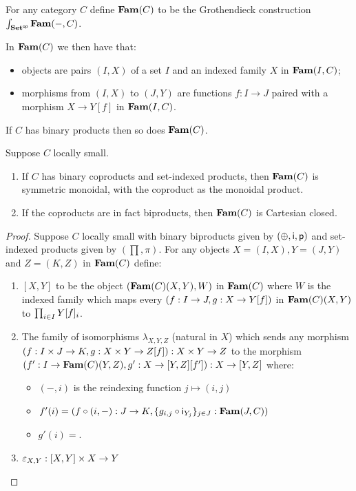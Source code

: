 \begin{definition}
For any category $C$ define $\mathbf{Fam}(C)$ to be the Grothendieck construction
$\int_{\mathbf{Set}^{\mathsf{op}}}\mathbf{Fam}(-,C)$.
\end{definition}

In $\mathbf{Fam}(C)$ we then have that:
\begin{itemize}
\item objects are pairs $(I, X)$ of a set $I$ and an indexed family $X$ in $\mathbf{Fam}(I,C)$;
\item morphisms from $(I, X)$ to $(J, Y)$ are functions $f: I \to J$ paired with a morphism $X \to Y[f]$ in
$\mathbf{Fam}(I,C)$.
\end{itemize}

\begin{proposition}
If $C$ has binary products then so does $\mathbf{Fam}(C)$.
\end{proposition}

\begin{proposition}
Suppose $C$ locally small.
\begin{enumerate}
\item If $C$ has binary coproducts and set-indexed products, then $\mathbf{Fam}(C)$ is symmetric monoidal, with the
coproduct as the monoidal product.
\item If the coproducts are in fact biproducts, then $\mathbf{Fam}(C)$ is Cartesian closed.
\end{enumerate}
\end{proposition}

\begin{proof}
Suppose $C$ locally small with binary biproducts given by $(\oplus,\mathsf{i},\mathsf{p})$ and set-indexed products
given by $(\prod,\pi)$. For any objects $X = (I, X), Y = (J, Y)$ and $Z = (K, Z)$ in $\mathbf{Fam}(C)$ define:

\begin{enumerate}
\item $[X, Y]$ to be the object $(\mathbf{Fam}(C)(X,Y),W)$ in $\mathbf{Fam}(C)$ where $W$ is the indexed family which maps
every $(f: I \to J, g: X \to Y[f])$ in $\mathbf{Fam}(C)(X,Y)$ to $\prod_{i \in I}Y[f]_i$.
\item The family of isomorphisms $\lambda_{X,Y,Z}$ (natural in $X$) which sends any morphism $(f: I \times J
\to K, g: X \times Y \to Z[f]): X \times Y \to Z$ to the morphism $(f': I \to \mathbf{Fam}(C)(Y,Z), g': X
\to [Y, Z][f']): X \to [Y, Z]$ where:
\begin{itemize}
\item $(-, i)$ is the reindexing function $j \mapsto (i, j)$
\item $f'(i) = (f \circ (i, -): J \to K, \{g_{i,j} \circ \mathsf{i}_{Y_j}\}_{j \in J}: \mathbf{Fam}(J,C))$
\item $g'(i) = $.
\end{itemize}
\item $\varepsilon_{X,Y}: [X, Y] \times X \to Y$
\end{enumerate}
\end{proof}
